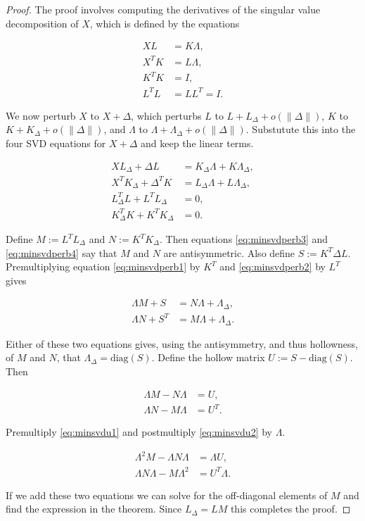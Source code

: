\documentclass[
  12pt,
]{book}
\theoremstyle{definition}
\theoremstyle{definition}
\theoremstyle{definition}
\theoremstyle{definition}
\theoremstyle{remark}
\begin{document}
\begin{proof}
The proof involves computing the derivatives of the singular value decomposition of \(X\), which is defined by the equations

\begin{align}
XL&=K\Lambda,\label{eq:minsvd1}\\
X^TK&=L\Lambda,\label{eq:minsvd2}\\
K^TK&=I,\label{eq:minsvd3}\\
L^TL&=LL^T=I.\label{eq:minsvd4}
\end{align}

We now perturb \(X\) to \(X+\Delta\), which perturbs \(L\) to \(L+L_\Delta+o(\|\Delta\|)\),
\(K\) to \(K+K_\Delta+o(\|\Delta\|)\), and \(\Lambda\) to \(\Lambda+\Lambda_\Delta+o(\|\Delta\|)\). Substutute this into the four SVD equations
for \(X+\Delta\) and keep the linear terms.

\begin{align}
XL_\Delta+\Delta L&=K_\Delta\Lambda+K\Lambda_\Delta,\label{eq:minsvdperb1}\\
X^TK_\Delta+\Delta^TK&=L_\Delta\Lambda+L\Lambda_\Delta,\label{eq:minsvdperb2}\\
L_\Delta^TL+L^TL_\Delta&=0,\label{eq:minsvdperb3}\\
K_\Delta^TK+K^TK_\Delta&=0.\label{eq:minsvdperb4}
\end{align}

Define \(M:=L^TL_\Delta\) and \(N:=K^TK_\Delta\). Then equations \eqref{eq:minsvdperb3} and \eqref{eq:minsvdperb4} say that \(M\) and \(N\) are antisymmetric. Also define \(S:=K^T\Delta L\). Premultiplying equation \eqref{eq:minsvdperb1} by \(K^T\) and \eqref{eq:minsvdperb2}
by \(L^T\) gives

\begin{align}
\Lambda M+S&=N\Lambda+\Lambda_\Delta,\label{eq:minsvdred1}\\
\Lambda N+S^T&=M\Lambda+\Lambda_\Delta.\label{eq:minsvdred2}
\end{align}

Either of these two equations gives, using the antisymmetry, and thus hollowness, of \(M\) and \(N\), that \(\Lambda_\Delta=\text{diag}(S)\). Define the hollow matrix \(U:=S-\text{diag}(S)\). Then

\begin{align}
\Lambda M-N\Lambda&=U,\label{eq:minsvdu1}\\
\Lambda N-M\Lambda&=U^T.\label{eq:minsvdu2}
\end{align}

Premultiply \eqref{eq:minsvdu1} and postmultiply \eqref{eq:minsvdu2} by \(\Lambda\).

\begin{align}
\Lambda^2 M-\Lambda N\Lambda&=\Lambda U,\label{eq:minsvdu3}\\
\Lambda N\Lambda-M\Lambda^2&=U^T\Lambda.\label{eq:minsvdu4}
\end{align}

If we add these two equations we can solve for the off-diagonal elements of \(M\)
and find the expression in the theorem. Since \(L_\Delta=LM\) this completes the proof.
\end{proof}
\end{document}
